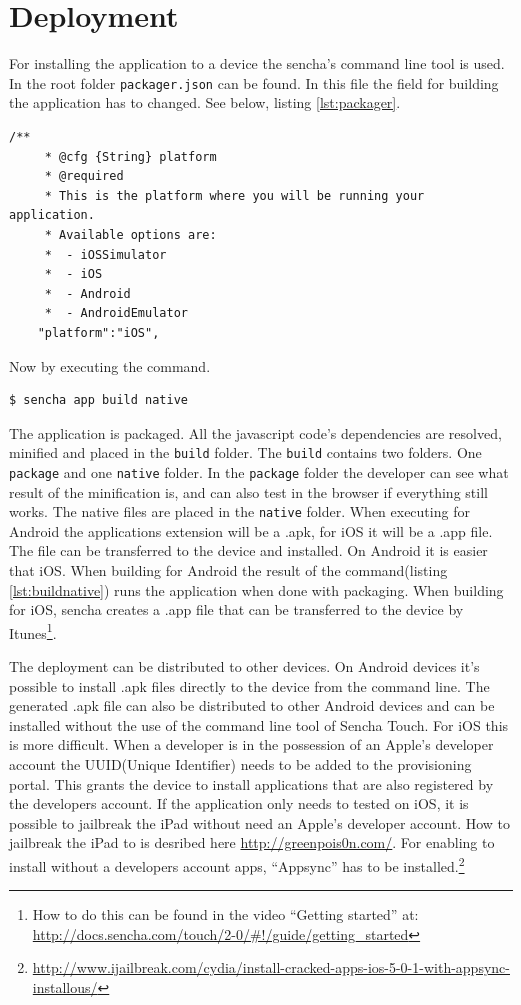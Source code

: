 \section{Deployment}
For installing the application to a device the sencha's command line tool is used. In the root folder \texttt{packager.json} can be found. In this file the field for building the application has to changed. See below, listing \ref{lst:packager}.
\begin{lstlisting}[caption={packager.json},label={lst:packager}]
	/**
	 * @cfg {String} platform
	 * @required
	 * This is the platform where you will be running your application.
	 * Available options are:
	 *  - iOSSimulator
	 *  - iOS
	 *  - Android
	 *  - AndroidEmulator
	"platform":"iOS",
\end{lstlisting}
Now by executing the command.
\label{appnative}
\begin{lstlisting}[caption={command to build native},label={lst:buildnative}]
$ sencha app build native
\end{lstlisting}
The application is packaged. All the javascript code's dependencies are resolved, minified and placed in the \texttt{build} folder. The \texttt{build} contains two folders. One \texttt{package} and one \texttt{native} folder. In the \texttt{package} folder the developer can see what result of the minification is, and can also test in the browser if everything still works. The native files are placed in the \texttt{native} folder. When executing for Android the applications extension will be a .apk,  for iOS it will be a .app file.  The file can be transferred to the device and installed. On Android it is easier that iOS. When building for Android the result of the command(listing \ref{lst:buildnative}) runs the application when done with packaging. When building for iOS, sencha creates a .app file that can be transferred to the device by Itunes\footnote{How to do this can be found in the video ``Getting started'' at: \url{http://docs.sencha.com/touch/2-0/\#!/guide/getting\_started}}.

The deployment can be distributed to other devices. On Android devices it's possible to install .apk files directly to the device from the command line. The generated .apk file can also be distributed to other Android devices and can be installed without the use of the command line tool of Sencha Touch.
For iOS this is more difficult. When a developer is in the possession of an Apple's developer account the UUID(Unique Identifier) needs to be added to the provisioning portal. This grants the device to install applications that are also registered by the developers account. If the application only needs to tested on iOS, it is possible to jailbreak the iPad without need an Apple's developer account. How to jailbreak the iPad to is desribed here \url{http://greenpois0n.com/}. For enabling to install without a developers account apps, ``Appsync'' has to be installed.\footnote{\url{http://www.ijailbreak.com/cydia/install-cracked-apps-ios-5-0-1-with-appsync-installous/}}

